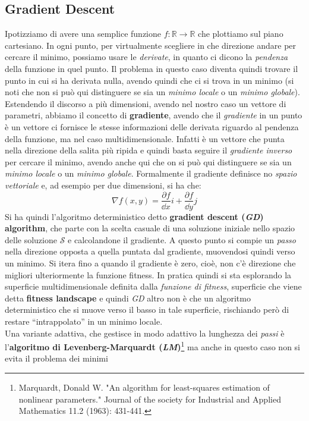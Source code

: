 \documentclass[a4paper,12pt, oneside]{book}
\begin{document}
\subsection{Gradient Descent}
Ipotizziamo di avere una semplice funzione $f:\mathbb{R}\to\mathbb{R}$ che
plottiamo sul piano cartesiano. In ogni punto, per virtualmente scegliere in che
direzione andare 
per cercare il minimo, possiamo usare le \textit{derivate}, in quanto ci dicono
la \textit{pendenza} della funzione in quel punto. Il problema in questo caso
diventa quindi trovare il punto in cui si ha derivata nulla, avendo quindi che
ci si trova in un minimo (si noti che non si può qui distinguere se sia un
\textit{minimo locale} o un \textit{minimo globale}).\\
Estendendo il discorso a più
dimensioni, avendo nel nostro caso un vettore di parametri, abbiamo il concetto
di \textbf{gradiente}, avendo che il 
\textit{gradiente} in un punto è un vettore ci fornisce le stesse informazioni
delle derivata riguardo al pendenza della funzione, ma nel caso
multidimensionale. Infatti è un vettore che punta nella direzione della salita
più ripida e quindi basta seguire il \textit{gradiente inverso} per cercare il
minimo, avendo anche qui che on si può qui distinguere se sia un
\textit{minimo locale} o un \textit{minimo globale}. Formalmente il gradiente
definisce no \textit{spazio 
  vettoriale} e, ad esempio per due dimensioni, si ha che:
\[\nabla f(x,y)=\frac{\partial f}{\dd{x}}i+\frac{\partial f}{\dd{y}}j\]
Si ha quindi l'algoritmo deterministico detto \textbf{gradient descent
  (\textit{GD}) algorithm}, che parte con la scelta casuale di una soluzione iniziale nello
spazio delle soluzione $\mathcal{S}$ e calcolandone il gradiente. A questo punto
si compie un \textit{passo} nella direzione opposta a quella puntata dal
gradiente, 
muovendosi quindi verso un minimo. Si itera fino a quando il gradiente è zero,
cioè, non c'è direzione che migliori ulteriormente la funzione fitness. In
pratica quindi si sta esplorando la superficie multidimensionale definita dalla
\textit{funzione di fitness}, superficie che viene detta \textbf{fitness
  landscape} e quindi \textit{GD} altro non è che un algoritmo deterministico
che si muove verso il basso in tale superficie, rischiando però di restare
``intrappolato'' in un minimo locale.\\ 
Una variante adattiva, che gestisce in modo adattivo la lunghezza dei
\textit{passi} è l'\textbf{algoritmo di Levenberg-Marquardt
  (\textit{LM})}\footnote{Marquardt, 
  Donald W. "An algorithm for least-squares estimation of nonlinear parameters."
  Journal of the society for Industrial and Applied Mathematics 11.2 (1963):
  431-441.} ma anche in questo caso non si evita il problema dei minimi
\end{document}
